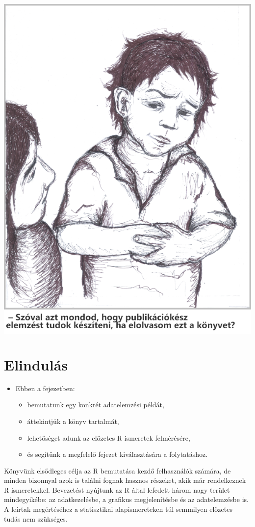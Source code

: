 \documentclass[
]{book}
\providecommand{\tightlist}{%
  \setlength{\itemsep}{0pt}\setlength{\parskip}{0pt}}
\newenvironment{rmdblock}[1]
  {\begin{shaded*}
  \begin{itemize}
  \renewcommand{\labelitemi}{
    \raisebox{-.7\height}[0pt][0pt]{
      {\setkeys{Gin}{width=3em,keepaspectratio}\texttt{[image: images/\#1]}}
    }
  }
  \item
  }
  {
  \end{itemize}
  \end{shaded*}
  }
\newenvironment{rmdlevel1}
  {\begin{rmdblock}{level1}}
  {\end{rmdblock}}
\begin{document}
\begin{center}\includegraphics[width=0.7\linewidth]{images/ch_01_small} \end{center}



\hypertarget{Itt-kezdodik-1-szint}{%
\section{Elindulás}\label{Itt-kezdodik-1-szint}}

\begin{rmdlevel1}
Ebben a fejezetben:

\begin{itemize}
\tightlist
\item
  bemutatunk egy konkrét adatelemzési példát,
\item
  áttekintjük a könyv tartalmát,
\item
  lehetőséget adunk az előzetes R ismeretek felmérésére,
\item
  és segítünk a megfelelő fejezet kiválasztására a folytatáshoz.
\end{itemize}
\end{rmdlevel1}

Könyvünk elsődleges célja az R bemutatása kezdő felhasználók számára, de minden bizonnyal azok is találni fognak hasznos részeket, akik már rendelkeznek R ismeretekkel. Bevezetést nyújtunk az R által lefedett három nagy terület mindegyikébe: az adatkezelésbe, a grafikus megjelenítésbe és az adatelemzésbe is. A leírtak megértéséhez a statisztikai alapismereteken túl semmilyen előzetes tudás nem szükséges.
\end{document}

